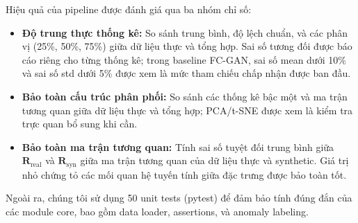 Hiệu quả của pipeline được đánh giá qua ba nhóm chỉ số:
\begin{itemize}
    \item \textbf{Độ trung thực thống kê:} So sánh trung bình, độ lệch chuẩn, và các phân vị (25\%, 50\%, 75\%) giữa dữ liệu thực và tổng hợp.
    Sai số tương đối được báo cáo riêng cho từng thống kê; trong baseline FC-GAN, sai số mean dưới 10\% và sai số std dưới 5\% được xem là mức tham chiếu chấp nhận được ban đầu.
    \item \textbf{Bảo toàn cấu trúc phân phối:} So sánh các thống kê bậc một và ma trận tương quan giữa dữ liệu thực và tổng hợp; PCA/t-SNE được xem là kiểm tra trực quan bổ sung khi cần.
    \item \textbf{Bảo toàn ma trận tương quan:} Tính sai số tuyệt đối trung bình giữa $\mathbf{R}_{\text{real}}$ và $\mathbf{R}_{\text{syn}}$
giữa ma trận tương quan của dữ liệu thực và synthetic.
Giá trị nhỏ chứng tỏ các mối quan hệ tuyến tính giữa đặc trưng được bảo toàn tốt.
\end{itemize}

Ngoài ra, chúng tôi sử dụng 50 unit tests (pytest) để đảm bảo tính đúng đắn của các module core,
bao gồm data loader, assertions, và anomaly labeling.

